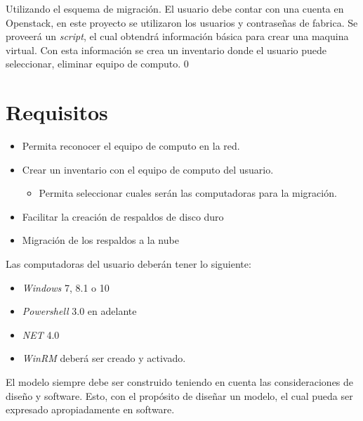 \documentclass[12pt,twoside]{reedthesis}
\providecommand{\tightlist}{%
  \setlength{\itemsep}{0pt}\setlength{\parskip}{0pt}}
\theoremstyle{definition}
\theoremstyle{definition}
\theoremstyle{definition}
\theoremstyle{remark}
\begin{document}
Utilizando el esquema de migración. El usuario debe contar con una
cuenta en Openstack, en este proyecto se utilizaron los usuarios y
contraseñas de fabrica. Se proveerá un \emph{script}, el cual obtendrá
información básica para crear una maquina virtual. Con esta información
se crea un inventario donde el usuario puede seleccionar, eliminar
equipo de computo. 0

\hypertarget{requisitos}{%
\section{Requisitos}\label{requisitos}}
\begin{itemize}
\tightlist
\item
  Permita reconocer el equipo de computo en la red.
\item
  Crear un inventario con el equipo de computo del usuario.
  \begin{itemize}
  \tightlist
  \item
    Permita seleccionar cuales serán las computadoras para la migración.
  \end{itemize}
\item
  Facilitar la creación de respaldos de disco duro
\item
  Migración de los respaldos a la nube
\end{itemize}
Las computadoras del usuario deberán tener lo siguiente:
\begin{itemize}
\tightlist
\item
  \emph{Windows} 7, 8.1 o 10
\item
  \emph{Powershell} 3.0 en adelante
\item
  \emph{NET} 4.0
\item
  \emph{WinRM} deberá ser creado y activado.
\end{itemize}
El modelo siempre debe ser construido teniendo en cuenta las
consideraciones de diseño y software. Esto, con el propósito de diseñar
un modelo, el cual pueda ser expresado apropiadamente en software.
\end{document}
